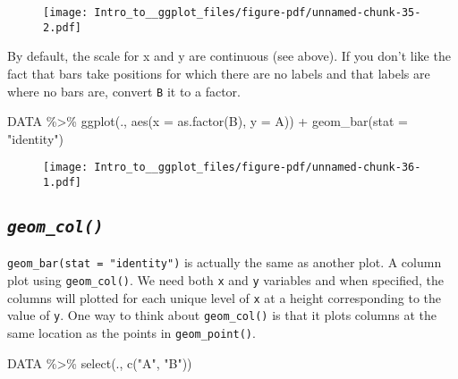 \documentclass[
  letterpaper,
  DIV=11,
  numbers=noendperiod]{scrartcl}
\newenvironment{Shaded}{\begin{snugshade}}{\end{snugshade}}
\newcommand{\AttributeTok}[1]{\textcolor[rgb]{0.40,0.45,0.13}{#1}}
\newcommand{\FunctionTok}[1]{\textcolor[rgb]{0.28,0.35,0.67}{#1}}
\newcommand{\NormalTok}[1]{\textcolor[rgb]{0.00,0.23,0.31}{#1}}
\newcommand{\SpecialCharTok}[1]{\textcolor[rgb]{0.37,0.37,0.37}{#1}}
\newcommand{\StringTok}[1]{\textcolor[rgb]{0.13,0.47,0.30}{#1}}
\begin{document}
\begin{figure}[H]

{\centering \texttt{[image: Intro\_to\_\_ggplot\_files/figure-pdf/unnamed-chunk-35-2.pdf]}

}

\end{figure}

By default, the scale for x and y are continuous (see above). If you
don't like the fact that bars take positions for which there are no
labels and that labels are where no bars are, convert \texttt{B} it to a
factor.

\begin{Shaded}
\begin{Highlighting}[]
\NormalTok{DATA }\SpecialCharTok{\%\textgreater{}\%}
  \FunctionTok{ggplot}\NormalTok{(., }\FunctionTok{aes}\NormalTok{(}\AttributeTok{x =} \FunctionTok{as.factor}\NormalTok{(B), }\AttributeTok{y =}\NormalTok{ A)) }\SpecialCharTok{+}
  \FunctionTok{geom\_bar}\NormalTok{(}\AttributeTok{stat =} \StringTok{"identity"}\NormalTok{)}
\end{Highlighting}
\end{Shaded}

\begin{figure}[H]

{\centering \texttt{[image: Intro\_to\_\_ggplot\_files/figure-pdf/unnamed-chunk-36-1.pdf]}

}

\end{figure}

\hypertarget{geom_col}{%
\subsection{\texorpdfstring{\emph{\texttt{geom\_col()}}}{geom\_col()}}\label{geom_col}}

\texttt{geom\_bar(stat\ =\ "identity")} is actually the same as another
plot. A column plot using \texttt{geom\_col()}. We need both \texttt{x}
and \texttt{y} variables and when specified, the columns will plotted
for each unique level of \texttt{x} at a height corresponding to the
value of \texttt{y}. One way to think about \texttt{geom\_col()} is that
it plots columns at the same location as the points in
\texttt{geom\_point()}.

\begin{Shaded}
\begin{Highlighting}[]
\NormalTok{DATA }\SpecialCharTok{\%\textgreater{}\%}
  \FunctionTok{select}\NormalTok{(., }\FunctionTok{c}\NormalTok{(}\StringTok{"A"}\NormalTok{, }\StringTok{"B"}\NormalTok{))}
\end{Highlighting}
\end{Shaded}
\end{document}
